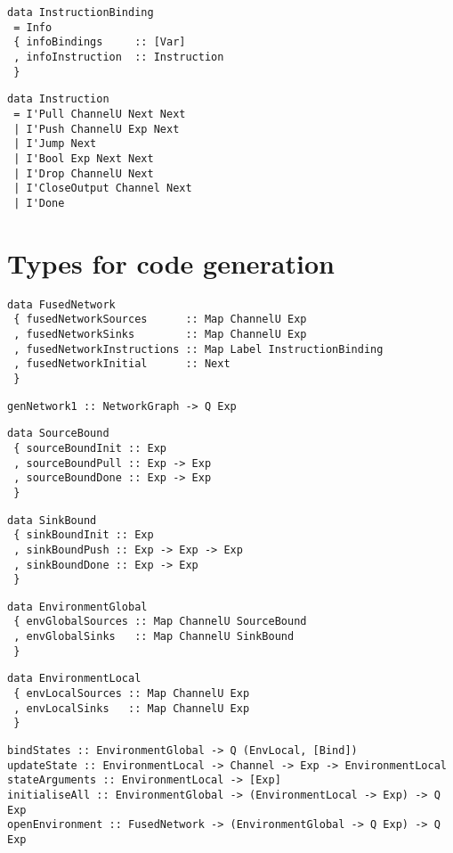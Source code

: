 \begin{lstlisting}
data InstructionBinding
 = Info
 { infoBindings     :: [Var]
 , infoInstruction  :: Instruction
 }
\end{lstlisting}

\begin{lstlisting}
data Instruction
 = I'Pull ChannelU Next Next
 | I'Push ChannelU Exp Next
 | I'Jump Next
 | I'Bool Exp Next Next
 | I'Drop ChannelU Next
 | I'CloseOutput Channel Next
 | I'Done
\end{lstlisting}

\section{Types for code generation}

\begin{lstlisting}
data FusedNetwork
 { fusedNetworkSources      :: Map ChannelU Exp
 , fusedNetworkSinks        :: Map ChannelU Exp
 , fusedNetworkInstructions :: Map Label InstructionBinding
 , fusedNetworkInitial      :: Next
 }
\end{lstlisting}

\begin{lstlisting}
genNetwork1 :: NetworkGraph -> Q Exp
\end{lstlisting}


\begin{lstlisting}
data SourceBound
 { sourceBoundInit :: Exp
 , sourceBoundPull :: Exp -> Exp
 , sourceBoundDone :: Exp -> Exp
 }
\end{lstlisting}

\begin{lstlisting}
data SinkBound
 { sinkBoundInit :: Exp
 , sinkBoundPush :: Exp -> Exp -> Exp
 , sinkBoundDone :: Exp -> Exp
 }
\end{lstlisting}

\begin{lstlisting}
data EnvironmentGlobal
 { envGlobalSources :: Map ChannelU SourceBound
 , envGlobalSinks   :: Map ChannelU SinkBound
 }
\end{lstlisting}

\begin{lstlisting}
data EnvironmentLocal
 { envLocalSources :: Map ChannelU Exp
 , envLocalSinks   :: Map ChannelU Exp
 }
\end{lstlisting}

\begin{lstlisting}
bindStates :: EnvironmentGlobal -> Q (EnvLocal, [Bind])
updateState :: EnvironmentLocal -> Channel -> Exp -> EnvironmentLocal
stateArguments :: EnvironmentLocal -> [Exp]
initialiseAll :: EnvironmentGlobal -> (EnvironmentLocal -> Exp) -> Q Exp
openEnvironment :: FusedNetwork -> (EnvironmentGlobal -> Q Exp) -> Q Exp
\end{lstlisting}




